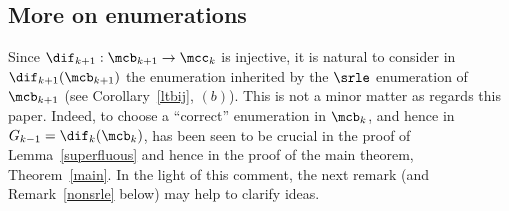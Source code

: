 \subsection{More on enumerations}

 Since $\dif_{k+1}:\mcb_{k+1}\to\mcc_{k}$ is injective, it is
natural to consider in $\dif_{k+1}(\mcb_{k+1})$ the enumeration
inherited by the $\srle$ enumeration of $\mcb_{k+1}$ (see
Corollary~\ref{ltbij}, $(b)$). This is not a minor matter as regards
this paper. Indeed, to choose a ``correct'' enumeration in $\mcb_{k}$,
and hence in $G_{k-1}=\dif_{k}(\mcb_{k})$, has been seen to be crucial
in the proof of Lemma~\ref{superfluous} and hence in the proof of the
main theorem, Theorem~\ref{main}. In the light of this comment, the
next remark (and Remark~\ref{nonsrle} below) may help to clarify
ideas.

